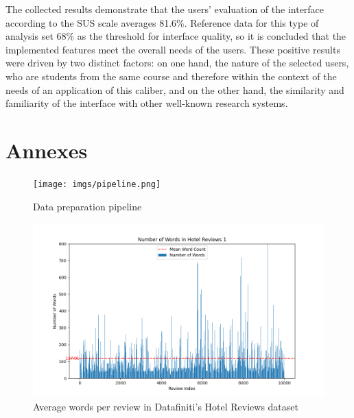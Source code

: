 \documentclass[sigconf]{acmart}
\begin{document}
The collected results demonstrate that the users' evaluation of the interface according to the SUS scale averages 81.6\%. Reference data for this type of analysis set 68\% as the threshold for interface quality, so it is concluded that the implemented features meet the overall needs of the users. These positive results were driven by two distinct factors: on one hand, the nature of the selected users, who are students from the same course and therefore within the context of the needs of an application of this caliber, and on the other hand, the similarity and familiarity of the interface with other well-known research systems.






\nocite{*}
\def\BibTex{BibTeX}


\appendix

\section{Annexes}

\begin{figure}[H]
  \centering
  \texttt{[image: imgs/pipeline.png]}
  \caption{Data preparation pipeline}
  \label{fig:pipeline}
\end{figure}

\begin{figure}[h]
  \centering
  \includegraphics[width=\linewidth]{imgs/word_count_1.png}
  \caption{Average words per review in Datafiniti's Hotel Reviews dataset}
  \label{fig:reviewWords1}
\end{figure}
\end{document}

